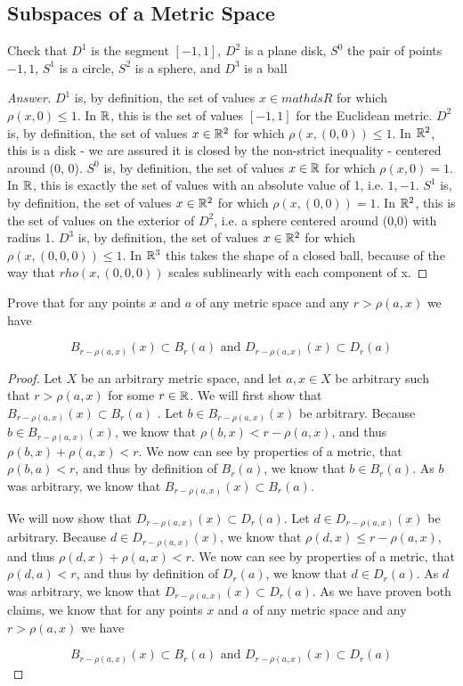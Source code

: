 \subsection{Subspaces of a Metric Space}
\begin{majorEx}%
Check that $D^1$ is the segment $[-1, 1]$, $D^2$ is a plane disk, $S^0$ the pair of points ${-1, 1}$, $S^1$ is a circle, $S^2$ is a sphere, and $D^3$ is a ball
\end{majorEx}
\begin{proof}[Answer]
$D^1$ is, by definition, the set of values $x \in mathds{R}$ for which $\rho (x, 0) \leq 1$. In $\mathbb{R}$, this is the set of values $[-1, 1]$ for the Euclidean metric.
$D^2$ is, by definition, the set of values $x \in \mathbb{R}^2$ for which $\rho (x, (0, 0)) \leq 1$. In $\mathbb{R}^2$, this is a disk - we are assured it is closed by the non-strict inequality - centered around (0, 0).
$S^0$ is, by definition, the set of values $x \in \mathbb{R}$ for which $\rho (x, 0) = 1$. In $\mathbb{R}$, this is exactly the set of values with an absolute value of 1, i.e. ${1, -1}$.
$S^1$ is, by definition, the set of values $x \in \mathbb{R}^2$ for which $\rho (x, (0, 0)) = 1$. In $\mathbb{R}^2$, this is the set of values on the exterior of $D^2$, i.e. a sphere centered around (0,0) with radius 1.
$D^3$ is, by definition, the set of values $x \in \mathbb{R}^2$ for which $\rho (x, (0, 0, 0)) \leq 1$. In $\mathbb{R}^3$ this takes the shape of a closed ball, because of the way that $rho (x, (0, 0, 0))$ scales sublinearly with each component of x.
\end{proof}

\begin{majorEx}%
  Prove that for any points $x$ and $a$ of any metric space and any $r
  > \rho(a,x)$ we have

  $$B_{r-\rho(a,x)}(x) \subset B_r(a) \text{  and  }
  D_{r-\rho(a,x)}(x) \subset D_r(a)$$
\end{majorEx}

\begin{proof}
  Let $X$ be an arbitrary metric space, and let $a,x\in X$ be
  arbitrary such that $r
  > \rho(a,x)$ for some $r\in \mathbb{R}$.  We will first show that 
  $B_{r-\rho(a,x)}(x) \subset B_r(a)$ . Let $b \in B_{r-\rho(a,x)}(x)$
  be arbitrary. Because $b \in B_{r-\rho(a,x)}(x)$, we know that
  $\rho(b,x) < r- \rho(a,x)$, and thus   $\rho(b,x) + \rho(a,x)<
  r$. We now can see by properties of a metric, that $\rho(b,a)<r$,
  and thus by definition of $B_r(a)$, we know that $b \in B_r(a)$. As
  $b$ was arbitrary, we know that $B_{r-\rho(a,x)}(x) \subset B_r(a)$.

  We will now show that $D_{r-\rho(a,x)}(x) \subset D_r(a)$. Let $d 
  \in D_{r-\rho(a,x)}(x)$ be arbitrary. Because $d \in D_{r-\rho(a,x)}(x)$, we know that
  $\rho(d,x) \leq r- \rho(a,x)$, and thus   $\rho(d,x) + \rho(a,x)<
  r$. We now can see by properties of a metric, that $\rho(d,a)<r$,
  and thus by definition of $D_r(a)$, we know that $d \in D_r(a)$. As
  $d$ was arbitrary, we know that $D_{r-\rho(a,x)}(x) \subset
  D_r(a)$. As we have proven both claims, we know that for any points
  $x$ and $a$ of any metric space and any $r 
  > \rho(a,x)$ we have

  $$B_{r-\rho(a,x)}(x) \subset B_r(a) \text{  and  }
  D_{r-\rho(a,x)}(x) \subset D_r(a)$$
\end{proof}